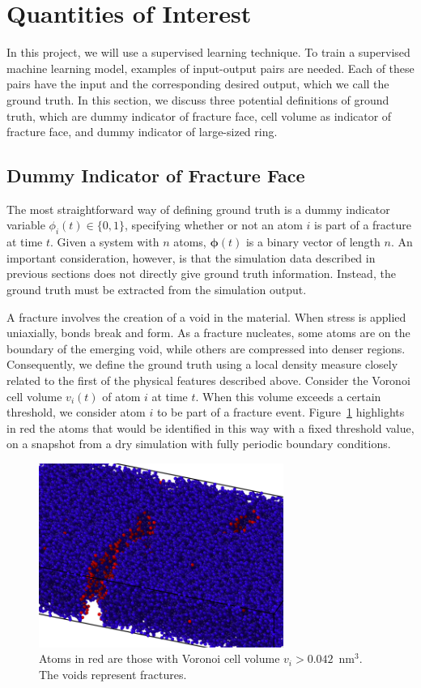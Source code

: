 \section{Quantities of Interest}

In this project, we will use a supervised learning technique. To train a supervised machine learning model, examples of input-output pairs are needed. Each of these pairs have the input and the corresponding desired output, which we call the ground truth. In this section, we discuss three potential definitions of ground truth, which are dummy indicator of fracture face, cell volume as indicator of fracture face, and dummy indicator of large-sized ring.

\subsection{Dummy Indicator of Fracture Face}

The most straightforward way of defining ground truth is a dummy indicator variable $\phi_i(t) \in\{0,1\}$, specifying whether or not an atom $i$ is part of a fracture at time $t$. Given a system with $n$ atoms, $\boldsymbol{\phi}(t)$ is a binary vector of length $n$. An important consideration, however, is that the simulation data described in previous sections does not directly give ground truth information. Instead, the ground truth must be extracted from the simulation output.

A fracture involves the creation of a void in the material. When stress is applied uniaxially, bonds break and form.  As a fracture nucleates, some atoms are on the boundary of the emerging void, while others are compressed into denser regions. Consequently, we define the ground truth using a local density measure closely related to the first of the physical features described above.  Consider the Voronoi cell volume $v_i(t)$ of atom $i$ at time $t$.  When this volume exceeds a certain threshold, we consider atom $i$ to be part of a fracture event.  Figure~\ref{fig:crack_vol} highlights in red the atoms that would be identified in this way with a fixed threshold value, on a snapshot from a dry simulation with fully periodic boundary conditions.

    \begin{figure}
    \centering
    \noindent
    \includegraphics[width=8cm, height=6cm]{crack_vol.png}
    \caption{Atoms in red are those with Voronoi cell volume $v_i>0.042$~nm$^3$.  The voids represent fractures.}
    \label{fig:crack_vol}
    \end{figure}
    
